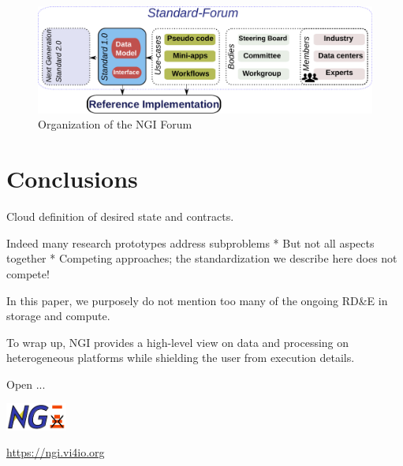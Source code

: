 \documentclass[a4paper, twocolumn]{article}
\begin{document}
\begin{figure}[b]
  \includegraphics[width=\columnwidth]{standardization}
  \caption{Organization of the NGI Forum}
  \label{fig:standardization}
\end{figure}

\section{Conclusions}
\label{sec:conclusions}


Cloud definition of desired state and contracts.

Indeed many research prototypes address subproblems
* But not all aspects together
* Competing approaches; the standardization we describe here does not compete!

In this paper, we purposely do not mention too many of the ongoing RD\&E in storage and compute.




To wrap up, NGI provides a high-level view on data and processing on heterogeneous platforms while shielding the user from execution details.

Open ...

\includegraphics[width=2cm]{ngi-logo}

\noindent\url{https://ngi.vi4io.org}
\end{document}
